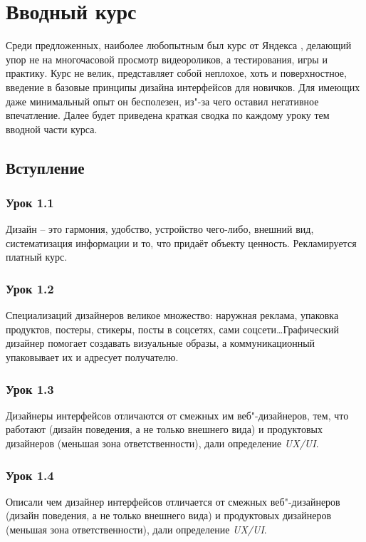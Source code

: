 \documentclass[variant=practice]{bsuir}
\begin{document}
\chapter{Вводный курс }

Среди предложенных, наиболее любопытным был курс от Яндекса \cite{about-yandex},
делающий упор не на многочасовой просмотр видеороликов, а тестирования, игры и
практику. Курс не велик, представляет собой неплохое, хоть и поверхностное,
введение в базовые принципы дизайна интерфейсов для новичков. Для имеющих даже
минимальный опыт он бесполезен, из"-за чего оставил негативное впечатление.
Далее будет приведена краткая сводка по каждому уроку тем вводной части курса.

\section{Вступление}

\subsection{Урок 1.1} Дизайн -- это гармония, удобство, устройство чего-либо,
внешний вид, систематизация информации и то, что придаёт объекту ценность.
Рекламируется платный курс.

\subsection{Урок 1.2} Специализаций дизайнеров великое множество: наружная
реклама, упаковка продуктов, постеры, стикеры, посты в соцсетях, сами
соцсети\dots Графический дизайнер помогает создавать визуальные образы, а
коммуникационный упаковывает их и адресует получателю.

\subsection{Урок 1.3} Дизайнеры интерфейсов отличаются от смежных им
веб"-дизайнеров, тем, что работают (дизайн поведения, а не только внешнего вида)
и продуктовых дизайнеров (меньшая зона ответственности), дали определение
\textit{UX/UI}.

\subsection{Урок 1.4} Описали чем дизайнер интерфейсов отличается от смежных
веб"-дизайнеров (дизайн поведения, а не только внешнего вида) и
продуктовых дизайнеров (меньшая зона ответственности), дали
определение \textit{UX/UI}.
\end{document}
